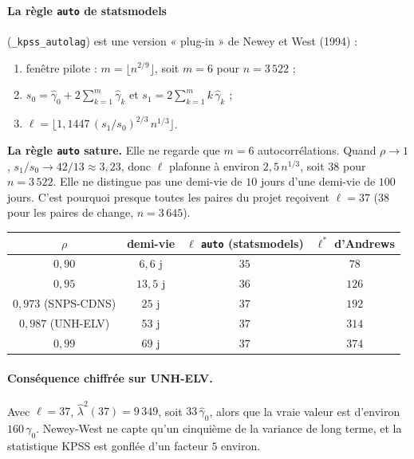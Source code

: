 \documentclass[11pt,a4paper]{article}
\newcommand{\code}[1]{\texttt{#1}}
\theoremstyle{definition}
\begin{document}
\paragraph{La règle \code{auto} de statsmodels} (\code{\_kpss\_autolag}) est une version « plug-in » de Newey et West (1994) :
\begin{enumerate}
\item fenêtre pilote : $m = \lfloor n^{2/9}\rfloor$, soit $m = 6$ pour $n = 3\,522$ ;
\item $s_0 = \hat\gamma_0 + 2\sum_{k=1}^{m}\hat\gamma_k$ et $s_1 = 2\sum_{k=1}^{m}k\,\hat\gamma_k$ ;
\item $\ell = \bigl\lfloor 1{,}1447\,(s_1/s_0)^{2/3}\,n^{1/3}\bigr\rfloor$.
\end{enumerate}

\begin{piege}
\textbf{La règle \code{auto} sature.} Elle ne regarde que $m = 6$ autocorrélations. Quand $\rho \to 1$, $s_1/s_0 \to 42/13 \approx 3{,}23$, donc $\ell$ plafonne à environ $2{,}5\,n^{1/3}$, soit $38$ pour $n = 3\,522$. Elle ne distingue pas une demi-vie de $10$ jours d'une demi-vie de $100$ jours. C'est pourquoi presque toutes les paires du projet reçoivent $\ell = 37$ ($38$ pour les paires de change, $n = 3\,645$).
\end{piege}

\begin{center}
\begin{tabular}{@{}cccc@{}}
\toprule
$\rho$ & demi-vie & $\ell$ \code{auto} (statsmodels) & $\ell^*$ d'Andrews \\
\midrule
$0{,}90$ & $6{,}6$ j & $35$ & $78$ \\
$0{,}95$ & $13{,}5$ j & $36$ & $126$ \\
$0{,}973$ (SNPS-CDNS) & $25$ j & $37$ & $192$ \\
$0{,}987$ (UNH-ELV) & $53$ j & $37$ & $314$ \\
$0{,}99$ & $69$ j & $37$ & $374$ \\
\bottomrule
\end{tabular}
\end{center}

\paragraph{Conséquence chiffrée sur UNH-ELV.} Avec $\ell = 37$, $\hat\lambda^2(37) = 9\,349$, soit $33\,\hat\gamma_0$, alors que la vraie valeur est d'environ $160\,\gamma_0$. Newey-West ne capte qu'un cinquième de la variance de long terme, et la statistique KPSS est gonflée d'un facteur $5$ environ.
\end{document}
